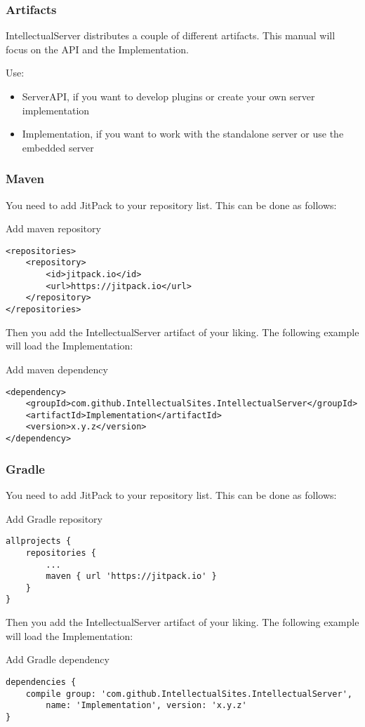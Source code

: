 \documentclass[12pt]{article}
\begin{document}
\subsubsection{Artifacts}
IntellectualServer distributes a couple of different artifacts.
This manual will focus on the API and the Implementation.

Use:
\begin{itemize}
	\item ServerAPI, if you want to develop plugins or create your own server implementation
	\item Implementation, if you want to work with the standalone server or use the embedded server
\end{itemize}



\subsubsection{Maven}
You need to add JitPack to your repository list.
This can be done as follows:
\begin{listing}[H]
\caption{Add maven repository}
\begin{verbatim}
<repositories>
    <repository>
        <id>jitpack.io</id>
        <url>https://jitpack.io</url>
    </repository>
</repositories>
\end{verbatim}
\end{listing}

Then you add the IntellectualServer artifact of your liking.
The following example will load the Implementation:
\begin{listing}[H]
\caption{Add maven dependency}
\begin{verbatim}
<dependency>
    <groupId>com.github.IntellectualSites.IntellectualServer</groupId>
    <artifactId>Implementation</artifactId>
    <version>x.y.z</version>
</dependency>
\end{verbatim}
\end{listing}

\subsubsection{Gradle}
You need to add JitPack to your repository list.
This can be done as follows:
\begin{listing}[H]
\caption{Add Gradle repository}
\begin{verbatim}
allprojects {
	repositories {
		...
		maven { url 'https://jitpack.io' }
	}
}
\end{verbatim}
\end{listing}

Then you add the IntellectualServer artifact of your liking.
The following example will load the Implementation:
\begin{listing}[H]
\caption{Add Gradle dependency}
\begin{verbatim}
dependencies {
	compile group: 'com.github.IntellectualSites.IntellectualServer',
		name: 'Implementation', version: 'x.y.z'
}
\end{verbatim}
\end{listing}

\newpage
\listoflistings
\end{document}
